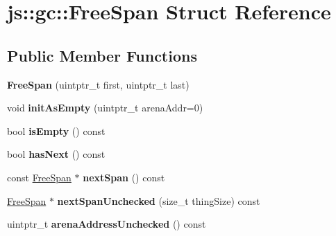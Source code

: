 \hypertarget{structjs_1_1gc_1_1_free_span}{\section{js\-:\-:gc\-:\-:Free\-Span Struct Reference}
\label{structjs_1_1gc_1_1_free_span}
}
\subsection*{Public Member Functions}
\begin{DoxyCompactItemize}
\item 
\hypertarget{structjs_1_1gc_1_1_free_span_a3c1b0fc18bb82769bdf95a9c8d4a2831}{{\bfseries Free\-Span} (uintptr\-\_\-t first, uintptr\-\_\-t last)}\label{structjs_1_1gc_1_1_free_span_a3c1b0fc18bb82769bdf95a9c8d4a2831}

\item 
\hypertarget{structjs_1_1gc_1_1_free_span_ae5645b1e421dc8ea6972d4c40f002b40}{void {\bfseries init\-As\-Empty} (uintptr\-\_\-t arena\-Addr=0)}\label{structjs_1_1gc_1_1_free_span_ae5645b1e421dc8ea6972d4c40f002b40}

\item 
\hypertarget{structjs_1_1gc_1_1_free_span_a49eb7e79f203b4b2807b3790ccb30dda}{bool {\bfseries is\-Empty} () const }\label{structjs_1_1gc_1_1_free_span_a49eb7e79f203b4b2807b3790ccb30dda}

\item 
\hypertarget{structjs_1_1gc_1_1_free_span_af71321cb240bb9868cd24c402e0c9fad}{bool {\bfseries has\-Next} () const }\label{structjs_1_1gc_1_1_free_span_af71321cb240bb9868cd24c402e0c9fad}

\item 
\hypertarget{structjs_1_1gc_1_1_free_span_ab8992992a81f3c8ce22d2e93d8e89cd1}{const \hyperlink{structjs_1_1gc_1_1_free_span}{Free\-Span} $\ast$ {\bfseries next\-Span} () const }\label{structjs_1_1gc_1_1_free_span_ab8992992a81f3c8ce22d2e93d8e89cd1}

\item 
\hypertarget{structjs_1_1gc_1_1_free_span_a4eca3704828304ae9174ac41ba2d3b17}{\hyperlink{structjs_1_1gc_1_1_free_span}{Free\-Span} $\ast$ {\bfseries next\-Span\-Unchecked} (size\-\_\-t thing\-Size) const }\label{structjs_1_1gc_1_1_free_span_a4eca3704828304ae9174ac41ba2d3b17}

\item 
\hypertarget{structjs_1_1gc_1_1_free_span_a112e6a2b73b871921226a78eebc4496f}{uintptr\-\_\-t {\bfseries arena\-Address\-Unchecked} () const }\label{structjs_1_1gc_1_1_free_span_a112e6a2b73b871921226a78eebc4496f}


\end{DoxyCompactItemize}
